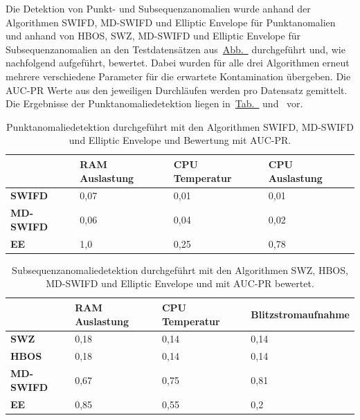 Die Detektion von Punkt- und Subsequenzanomalien wurde anhand der Algorithmen SWIFD, MD-SWIFD und Elliptic Envelope für Punktanomalien und anhand von HBOS, SWZ,
MD-SWIFD und Elliptic Envelope für Subsequenzanomalien an den Testdatensätzen aus~\hyperref[fig:punktanomalien_testdata]{Abb.~}
durchgeführt und, wie nachfolgend aufgeführt, bewertet. Dabei wurden für alle drei Algorithmen erneut mehrere verschiedene Parameter für die erwartete Kontamination
übergeben. Die AUC-PR Werte aus den jeweiligen Durchläufen werden pro Datensatz gemittelt. Die Ergebnisse der Punktanomaliedetektion liegen
in~\hyperref[tab:punktanomaliedetektion_kreuzweise]{Tab.~} und~ vor.

\begin{table}[H]
    \centering
    \renewcommand{\arraystretch}{1.5} %
    \begin{tabular}{l|lll}
                      & \textbf{RAM Auslastung}   & \textbf{CPU Temperatur}   & \textbf{CPU Auslastung} \\
    \hline
    \textbf{SWIFD}    & \cellcolor{red!20}0,07   & \cellcolor{red!30}0,01     & \cellcolor{red!30}0,01 \\
    \textbf{MD-SWIFD} & \cellcolor{red!20}0,06   & \cellcolor{red!20}0,04     & \cellcolor{red!30}0,02 \\
    \textbf{EE}       & \cellcolor{green!40}1,0  & \cellcolor{red!5}0,25   & \cellcolor{green!25}0,78 
    \end{tabular}
    \caption{Punktanomaliedetektion durchgeführt mit den Algorithmen SWIFD, MD-SWIFD und Elliptic Envelope und Bewertung mit AUC-PR.}
    \label{tab:punktanomaliedetektion_kreuzweise}
\end{table}

\begin{table}[t!]
    \centering
    \renewcommand{\arraystretch}{1.5} %
    \begin{tabular}{l|lll}
                      & \textbf{RAM Auslastung}   & \textbf{CPU Temperatur}   & \textbf{Blitzstromaufnahme} \\
    \hline
    \textbf{SWZ}      & \cellcolor{red!17}0,18   & \cellcolor{red!20}0,14     & \cellcolor{red!20}0,14 \\
    \textbf{HBOS}     & \cellcolor{red!17}0,18   & \cellcolor{red!20}0,14     & \cellcolor{red!20}0,14 \\
    \textbf{MD-SWIFD} & \cellcolor{green!15}0,67 & \cellcolor{green!25}0,75   & \cellcolor{green!30}0,81 \\
    \textbf{EE}       & \cellcolor{green!30}0,85 & \cellcolor{green!10}0,55   & \cellcolor{red!12}0,2 
    \end{tabular}
    \caption{Subsequenzanomaliedetektion durchgeführt mit den Algorithmen SWZ, HBOS, MD-SWIFD und Elliptic Envelope und mit AUC-PR bewertet.}
    \label{tab:subsequenzanomaliedetektion_kreuzweise}
\end{table}

